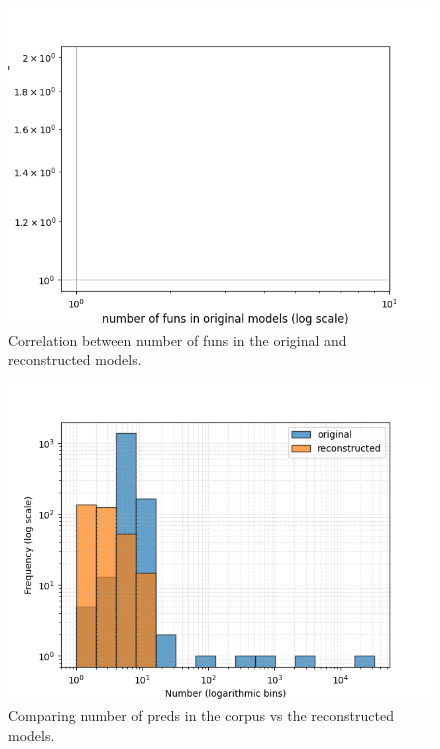 \documentclass[conference]{IEEEtran}
\begin{document}
    
    \begin{figure}[htbp]
    \centerline{\includegraphics[width=\linewidth]{"./Correlation between number of funs in the original and reconstructed models.png"}}
    \caption{Correlation between number of funs in the original and reconstructed models.}
    \label{fig}
    \end{figure}
    
    
    \begin{figure}[htbp]
    \centerline{\includegraphics[width=\linewidth]{"./Comparing number of preds in the corpus vs the reconstructed models.png"}}
    \caption{Comparing number of preds in the corpus vs the reconstructed models.}
    \label{fig}
    \end{figure}
    
\end{document}
